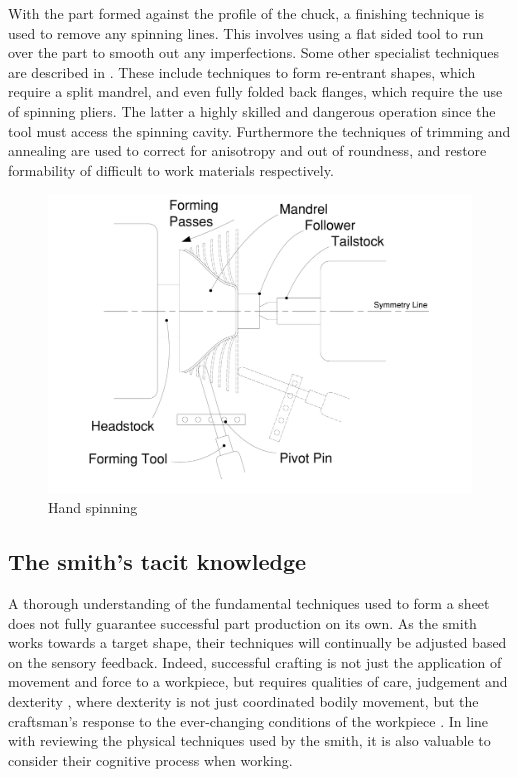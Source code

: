 With the part formed against the profile of the chuck, a finishing technique is used to remove any spinning lines.  This involves using a flat sided tool to run over the part to smooth out any imperfections.  Some other specialist techniques are described in \citep{Wiley2004TheHand-spinning}.  These include techniques to form re-entrant shapes, which require a split mandrel, and even fully folded back flanges, which require the use of spinning pliers. The latter a highly skilled and dangerous operation since the tool must access the spinning cavity. Furthermore the techniques of trimming and annealing are used to correct for anisotropy and out of roundness, and restore formability of difficult to work materials respectively.  

\begin{figure}[tbh!]
    \centering
    \includegraphics[width=0.6\linewidth]{Images/Spinning.pdf}
    \caption{Hand spinning}
    \label{fig:SpinningTechDrawing}
\end{figure}


\subsection{The smith's tacit knowledge} \label{sec:tacitknowledge}

A thorough understanding of the fundamental techniques used to form a sheet does not fully guarantee successful part production on its own. As the smith works towards a target shape, their techniques will continually be adjusted based on the sensory feedback. Indeed, successful crafting is not just the application of movement and force to a workpiece, but requires qualities of care, judgement and dexterity \citep{Pye2008TheWorkmanship}, where dexterity is not just coordinated bodily movement, but the craftsman's response to the ever-changing conditions of the workpiece \citep{Ingold2001BeyondSkill}. In line with reviewing the physical techniques used by the smith, it is also valuable to consider their cognitive process when working.

